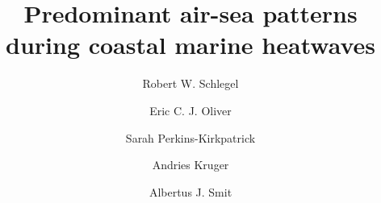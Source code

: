 \documentclass[a4paper,10pt,review]{elsarticle}
\begin{document}
\begin{frontmatter}

\title{Predominant air-sea patterns during coastal marine heatwaves}

\author[firstaddress]{Robert W. Schlegel}
\author[secondaddress,thirdaddress,fourthaddress]{Eric C. J. Oliver}
\author[fifthaddress]{Sarah Perkins-Kirkpatrick}
\author[sixthaddress,seventhaddress]{Andries Kruger}
\author[firstaddress]{Albertus J. Smit}

\address[firstaddress]{Department of Biodiversity and Conservation Biology, University of the Western Cape, Private Bag X17, Bellville 7535, South Africa}

\address[secondaddress]{ARC Centre of Excellence for Climate System Science, Australia}

\address[thirdaddress]{Institute for Marine and Antarctic Studies, University of Tasmania, Hobart, Australia}

\address[fourthaddress]{Department of Oceanography, Dalhousie University, Halifax, Nova Scotia, Canada}

\address[fifthaddress]{UWA Oceans Institute and School of Plant Biology, The University of Western Australia, Crawley, 6009 Western Australia, Australia}

\address[sixthaddress]{Climate Service, South African Weather Service, Pretoria, South Africa}

\address[seventhaddress]{Department of Geography, Geoinformatics and Meteorology, Faculty of Natural and Agricultural Sciences, University of Pretoria, South Africa}



\end{frontmatter}
\end{document}
